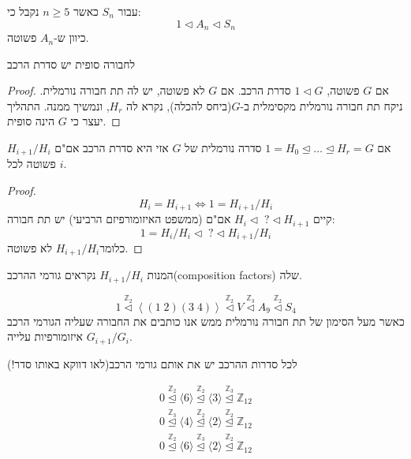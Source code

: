 \documentclass{tstextbook}
\begin{document}
\begin{corollary}
עבור \(S_{n}\) כאשר \(n\geq 5\) נקבל כי:
$$1\triangleleft A_{n}\triangleleft S_{n}$$
כיוון ש-\(A_{n}\) פשוטה.

\end{corollary}
\begin{proposition}
לחבורה סופית יש סדרת הרכב

\end{proposition}
\begin{proof}
אם \(G\) פשוטה, \(1\triangleleft G\) סדרת הרכב. אם \(G\) לא פשוטה, יש לה תת חבורה נורמלית. ניקח תת חבורה נורמלית מקסימלית ב-\(G\)(ביחס להכלה), נקרא לה \(H_{r}\), ונמשיך ממנה. התהליך יעצר כי \(G\) הינה סופית.

\end{proof}
\begin{proposition}
אם \(1=H_{0}\trianglelefteq \dots \trianglelefteq H_{r}=G\) סדרה נורמלית של \(G\) אזי היא סדרת הרכב אם"ם \(H_{i+1}/ H_{i}\) פשוטה לכל \(i\).

\end{proposition}
\begin{proof}
$$H_{i}=H_{i+1}\iff 1=H_{i+1} / H_{i}$$
קיים \(H_{i}\triangleleft \;?\triangleleft H_{i+1}\) אם"ם (ממשפט האיזומורפיזם הרביעי) יש תת חבורה:
$$1=H_{i }/ H_{i} \triangleleft \;?\triangleleft H_{i+1} / H_{i}$$
כלומר\(H_{i+1} / H_{i}\) לא פשוטה.

\end{proof}
\begin{definition}
המנות \(H_{i+1} / H_{i}\) נקראים גורמי ההרכב(composition factors) שלה.

\end{definition}
\begin{example}
$$1 \overset{ \mathbb{Z} _{2} }{ \triangleleft }\left\langle  \left( 1\; 2\right)(3\;4) \right\rangle \overset{ \mathbb{Z} _{2} }{ \triangleleft }V\overset{ \mathbb{Z} _{3} }{ \triangleleft } A_{9}\overset{ \mathbb{Z} _{2} }{ \triangleleft } S_{4}$$
כאשר מעל הסימון של תת חבורה נורמלית ממש אנו כותבים את החבורה שעליה הגורמי הרכב \(G_{i+1} / G_{i}\) איזומורפיות עלייה.

\end{example}
\begin{theorem}
לכל סדרות ההרכב יש את אותם גורמי הרכב(לאו דווקא באותו סדר!)

\end{theorem}
\begin{example}
$$\begin{gathered}0\stackrel{\mathbb{Z} _{2} }{\trianglelefteq} \langle 6\rangle \stackrel{\mathbb{Z} _{2} }{\trianglelefteq} \langle 3\rangle \stackrel{\mathbb{Z} _{3} }{\trianglelefteq} \mathbb{Z} _{12}\\0\stackrel{\mathbb{Z} _{3} }{\trianglelefteq} \langle 4\rangle \stackrel{\mathbb{Z} _{2} }{\trianglelefteq} \langle 2\rangle \stackrel{\mathbb{Z} _{2} }{\trianglelefteq} \mathbb{Z} _{12}\\0\stackrel{\mathbb{Z} _{2} }{\trianglelefteq} \langle 6\rangle \stackrel{\mathbb{Z} _{3} }{\trianglelefteq} \langle 2\rangle \stackrel{\mathbb{Z} _{2} }{\trianglelefteq} \mathbb{Z} _{12}
\end{gathered}$$

\end{example}
\end{document}
